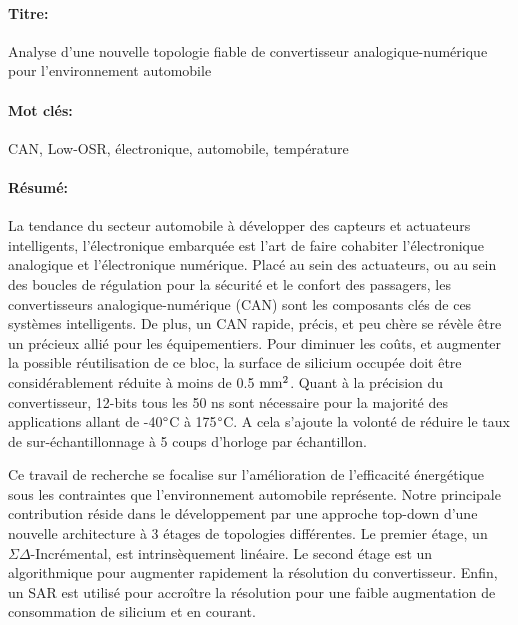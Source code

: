 \begin{mdframed}[linecolor=Prune,linewidth=1]
\fontsize{7}{9}\selectfont
\vspace{-.25cm}
\paragraph*{Titre:} Analyse d’une nouvelle topologie fiable de convertisseur analogique-numérique pour l'environnement automobile

\begin{small}
\vspace{-.5cm}
\paragraph*{Mot clés:} 
\fontsize{7}{9}\selectfont
CAN, Low-OSR, électronique, automobile, température
\vspace{-.5cm}
\begin{multicols}{2}
\fontsize{7}{9}\selectfont
\paragraph*{Résumé:} 
La tendance du secteur automobile à développer des capteurs et actuateurs intelligents, l'électronique embarquée est l'art de faire cohabiter l'électronique analogique et l'électronique numérique. Placé au sein des actuateurs, ou au sein des boucles de régulation pour la sécurité et le confort des passagers, les convertisseurs analogique-numérique (CAN) sont les composants clés de ces systèmes intelligents. De plus, un CAN rapide, précis, et peu chère se révèle être un précieux allié pour les équipementiers. Pour diminuer les coûts, et augmenter la possible réutilisation de ce bloc, la surface de silicium occupée doit être considérablement réduite à moins de 0.5 $\rm mm^2$. Quant à la précision du convertisseur, 12-bits tous les 50 ns sont nécessaire pour la majorité des applications allant de -40\(\degree \)C à 175\(\degree \)C. A cela s'ajoute la volonté de réduire le taux de sur-échantillonnage à 5 coups d'horloge par échantillon.

Ce travail de recherche se focalise sur l'amélioration de l'efficacité énergétique sous les contraintes que l'environnement automobile représente. Notre principale contribution réside dans le développement par une approche top-down d'une nouvelle architecture à 3 étages de topologies différentes. Le premier étage, un $\Sigma\Delta$-Incrémental, est intrinsèquement linéaire. Le second étage est un algorithmique pour augmenter rapidement la résolution du convertisseur. Enfin, un SAR est utilisé pour accroître la résolution pour une faible augmentation de consommation de silicium et en courant.


\end{multicols}
\end{small}
\end{mdframed}
